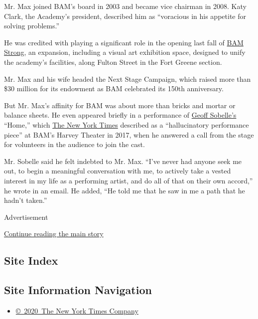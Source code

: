 Mr. Max joined BAM's board in 2003 and became vice chairman in 2008.
Katy Clark, the Academy's president, described him as ``voracious in his
appetite for solving problems.''

He was credited with playing a significant role in the opening last fall
of
\href{https://blog.bam.org/2019/03/a-first-look-at-bam-strong.html}{BAM
Strong}, an expansion, including a visual art exhibition space, designed
to unify the academy's facilities, along Fulton Street in the Fort
Greene section.

Mr. Max and his wife headed the Next Stage Campaign, which raised more
than \$30 million for its endowment as BAM celebrated its 150th
anniversary.

But Mr. Max's affinity for BAM was about more than bricks and mortar or
balance sheets. He even appeared briefly in a performance of
\href{https://www.nytimes.com/2014/11/07/theater/geoff-sobelles-the-object-lesson-at-bam.html}{Geoff
Sobelle's} ``Home,'' which
\href{https://www.nytimes.com/2017/12/07/theater/home-geoff-sobelle-review.html}{The
New York Times} described as a ``hallucinatory performance piece'' at
BAM's Harvey Theater in 2017, when he answered a call from the stage for
volunteers in the audience to join the cast.

Mr. Sobelle said he felt indebted to Mr. Max. ``I've never had anyone
seek me out, to begin a meaningful conversation with me, to actively
take a vested interest in my life as a performing artist, and do all of
that on their own accord,'' he wrote in an email. He added, ``He told me
that he saw in me a path that he hadn't taken.''

Advertisement

\protect\hyperlink{after-bottom}{Continue reading the main story}

\hypertarget{site-index}{%
\subsection{Site Index}\label{site-index}}

\hypertarget{site-information-navigation}{%
\subsection{Site Information
Navigation}\label{site-information-navigation}}

\begin{itemize}
\tightlist
\item
  \href{https://help.nytimes.com/hc/en-us/articles/115014792127-Copyright-notice}{©~2020~The
  New York Times Company}
\end{itemize}

